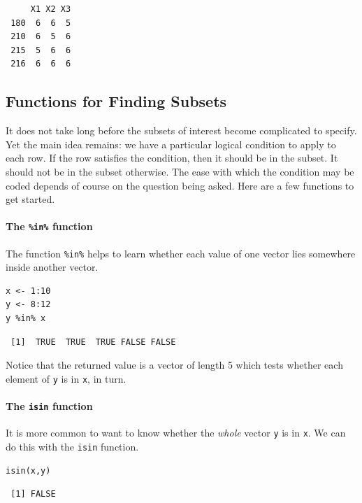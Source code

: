 \documentclass[captions=tableheading]{scrbook}
\begin{document}
\begin{verbatim}
     X1 X2 X3
 180  6  6  5
 210  6  5  6
 215  5  6  6
 216  6  6  6
\end{verbatim}
\subsection{Functions for Finding Subsets}
\label{sec-3-2-1}


It does not take long before the subsets of interest become complicated to specify. Yet the main idea remains: we have a particular logical condition to apply to each row. If the row satisfies the condition, then it should be in the subset. It should not be in the subset otherwise. The ease with which the condition may be coded depends of course on the question being asked. Here are a few functions to get started.

\paragraph*{The \texttt{\%in\%} function}

The function \texttt{\%in\%} helps to learn whether each value of one vector lies somewhere inside another vector. 


\begin{verbatim}
x <- 1:10 
y <- 8:12 
y %in% x
\end{verbatim}

\begin{verbatim}
 [1]  TRUE  TRUE  TRUE FALSE FALSE
\end{verbatim}

Notice that the returned value is a vector of length 5 which tests whether each element of \texttt{y} is in \texttt{x}, in turn.

\paragraph*{The \texttt{isin} function}

It is more common to want to know whether the \emph{whole} vector \texttt{y} is in \texttt{x}. We can do this with the \texttt{isin} function. 


\begin{verbatim}
isin(x,y)
\end{verbatim}

\begin{verbatim}
 [1] FALSE
\end{verbatim}
\end{document}
